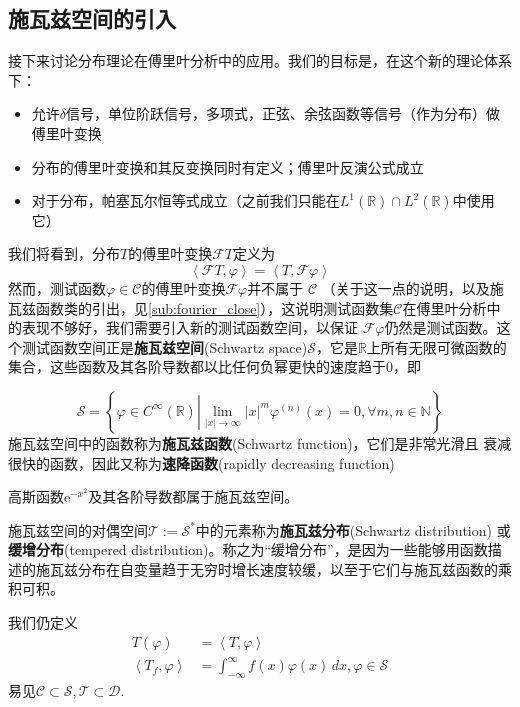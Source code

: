\documentclass{ctexbook}
\begin{document}
\subsection{施瓦兹空间的引入}\label{sub:schwartz}
接下来讨论分布理论在傅里叶分析中的应用。我们的目标是，在这个新的理论体系下：
\begin{itemize}
    \item 允许$\delta$信号，单位阶跃信号，多项式，正弦、余弦函数等信号（作为分布）做傅里叶变换
    \item 分布的傅里叶变换和其反变换同时有定义；傅里叶反演公式成立
    \item 对于分布，帕塞瓦尔恒等式成立（之前我们只能在$L^1(\mathbb{R})\cap L^2(\mathbb{R})$中使用它）
\end{itemize}
我们将看到，分布$T$的傅里叶变换$\mathcal{F} T$定义为
\begin{equation}
    \left\langle\mathcal{F}T,\varphi\right\rangle=\left\langle T,\mathcal{F}\varphi\right\rangle
\end{equation}
然而，测试函数$\varphi\in\mathcal{C} $的傅里叶变换$\mathcal{F}\varphi$并不属于
$\mathcal{C} $
（关于这一点的说明，以及施瓦兹函数类的引出，见\ref{sub:fourier_close}），这说明测试函数集$\mathcal{C} $在傅里叶分析中的表现不够好，我们需要引入新的测试函数空间，以保证
$\mathcal{F}\varphi$仍然是测试函数。这个测试函数空间正是\textbf{施瓦兹空间}(Schwartz space)$\mathcal{S} $\cite{brad_osgood_ee261}，它是$\mathbb{R}$上所有无限可微函数的集合，这些函数及其各阶导数都以比任何负幂更快的速度趋于0，即
\begin{definition}[施瓦兹空间与施瓦兹函数]
    \[\mathcal{S} =\left\{\varphi\in C^{\infty}(\mathbb{R} )\left|\lim_{|x|\to\infty}|x|^m\varphi^{(n)}(x)=0,\forall m,n\in\mathbb{N} \right.\right\}\]
施瓦兹空间中的函数称为\textbf{施瓦兹函数}(Schwartz function)，它们是非常光滑且
衰减很快的函数，因此又称为\textbf{速降函数}(rapidly decreasing function)
\end{definition}
\begin{example}
高斯函数$\mathrm{e}^{-x^2}$及其各阶导数都属于施瓦兹空间。
\end{example}
\begin{definition}[施瓦兹分布]
    施瓦兹空间的对偶空间$\mathcal{T} :=\mathcal{S}^*$中的元素称为\textbf{施瓦兹分布}(Schwartz distribution)
或\textbf{缓增分布}(tempered distribution)。称之为“缓增分布”，是因为一些能够用函数描述的施瓦兹分布在自变量趋于无穷时增长速度较缓，以至于它们与施瓦兹函数的乘积可积。
\end{definition}
我们仍定义
\begin{align}
    T(\varphi)                 & =\left\langle T,\varphi\right\rangle                                        \\
    \left\langle T_f,\varphi\right\rangle & =\int_{-\infty}^{\infty}f(x)\varphi(x)\,dx,\varphi\in\mathcal{S}
\end{align}
易见$\mathcal{C} \subset \mathcal{S} ,\mathcal{T} \subset\mathcal{D}. $
\end{document}
